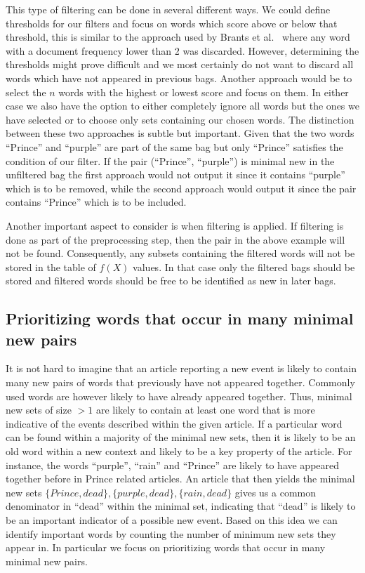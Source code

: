 This type of filtering can be done in several different ways. We could define thresholds for our filters and focus on words which score above or below that threshold, this is similar to the approach used by Brants et al.~\cite{brants2003system} where any word with a document frequency lower than 2 was discarded. However, determining the thresholds might prove difficult and we most certainly do not want to discard all words which have not appeared in previous bags. Another approach would be to select the $n$ words with the highest or lowest score and focus on them. In either case we also have the option to either completely ignore all words but the ones we have selected or to choose only sets containing our chosen words. The distinction between these two approaches is subtle but important. Given that the two words ``Prince'' and ``purple'' are part of the same bag but only ``Prince'' satisfies the condition of our filter. If the pair (``Prince'', ``purple'') is minimal new in the unfiltered bag the first approach would not output it since it contains ``purple'' which is to be removed, while the second approach would output it since the pair contains ``Prince'' which is to be included. 

Another important aspect to consider is when filtering is applied. If filtering is done as part of the preprocessing step, then the pair in the above example will not be found. Consequently, any subsets containing the filtered words will not be stored in the table of $f(X)$ values. In that case only the filtered bags should be stored and filtered words should be free to be identified as new in later bags. 

\subsection{Prioritizing words that occur in many minimal new pairs}
It is not hard to imagine that an article reporting a new event is likely to contain many new pairs of words that previously have not appeared together. Commonly used words are however likely to have already appeared together. Thus, minimal new sets of size $>1$ are likely to contain at least one word that is more indicative of the events described within the given article. If a particular word can be found within a majority of the minimal new sets, then it is likely to be an old word within a new context and likely to be a key property of the article. For instance, the words ``purple'', ``rain'' and ``Prince'' are likely to have appeared together before in Prince related articles. An article that then yields the minimal new sets $\{Prince, dead\}, \{purple, dead\}, \{rain, dead\}$ gives us a  common denominator in ``dead'' within the minimal set, indicating that ``dead'' is likely to be an important indicator of a possible new event. Based on this idea we can identify important words by counting the number of minimum new sets they appear in. In particular we focus on prioritizing words that occur in many minimal new pairs.

